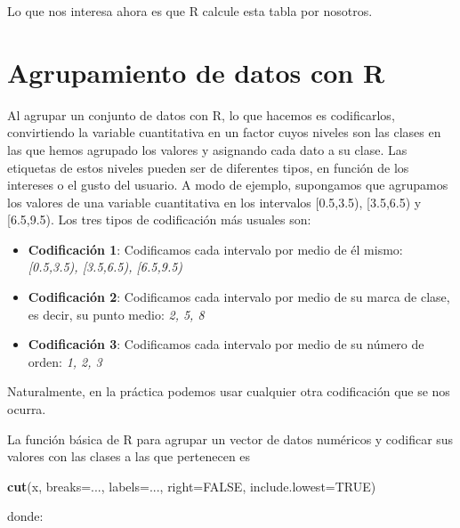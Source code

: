 \documentclass[
]{book}
\newenvironment{Shaded}{\begin{snugshade}}{\end{snugshade}}
\newcommand{\DataTypeTok}[1]{\textcolor[rgb]{0.13,0.29,0.53}{#1}}
\newcommand{\KeywordTok}[1]{\textcolor[rgb]{0.13,0.29,0.53}{\textbf{#1}}}
\newcommand{\NormalTok}[1]{#1}
\newcommand{\OtherTok}[1]{\textcolor[rgb]{0.56,0.35,0.01}{#1}}
\providecommand{\tightlist}{%
  \setlength{\itemsep}{0pt}\setlength{\parskip}{0pt}}
\theoremstyle{definition}
\theoremstyle{definition}
\theoremstyle{definition}
\theoremstyle{remark}
\begin{document}
Lo que nos interesa ahora es que R calcule esta tabla por nosotros.

\hypertarget{sec:agrupR}{%
\section{Agrupamiento de datos con R}\label{sec:agrupR}}

Al agrupar un conjunto de datos con R, lo que hacemos es codificarlos,
convirtiendo la variable cuantitativa en un factor cuyos niveles son las clases en las que hemos agrupado los valores y asignando cada dato a su clase. Las etiquetas de estos niveles pueden ser de diferentes tipos, en función de los intereses o el gusto del usuario. A modo de ejemplo, supongamos que agrupamos los valores de una variable cuantitativa en los intervalos
{[}0.5,3.5), {[}3.5,6.5) y {[}6.5,9.5). Los tres tipos de codificación más usuales son:

\begin{itemize}
\tightlist
\item
  \textbf{Codificación 1}: Codificamos cada intervalo por medio de él mismo: \emph{{[}0.5,3.5), {[}3.5,6.5), {[}6.5,9.5)}
\item
  \textbf{Codificación 2}: Codificamos cada intervalo por medio de su marca de clase, es decir, su punto medio: \emph{2, 5, 8}
\item
  \textbf{Codificación 3}: Codificamos cada intervalo por medio de su número de orden: \emph{1, 2, 3}
\end{itemize}

Naturalmente, en la práctica podemos usar cualquier otra codificación que se nos ocurra.

La función básica de R para agrupar un vector de datos numéricos y codificar
sus valores con las clases a las que pertenecen es

\begin{Shaded}
\begin{Highlighting}[]
\KeywordTok{cut}\NormalTok{(x, }\DataTypeTok{breaks=}\NormalTok{..., }\DataTypeTok{labels=}\NormalTok{..., }\DataTypeTok{right=}\OtherTok{FALSE}\NormalTok{, }\DataTypeTok{include.lowest=}\OtherTok{TRUE}\NormalTok{)}
\end{Highlighting}
\end{Shaded}

donde:
\end{document}
